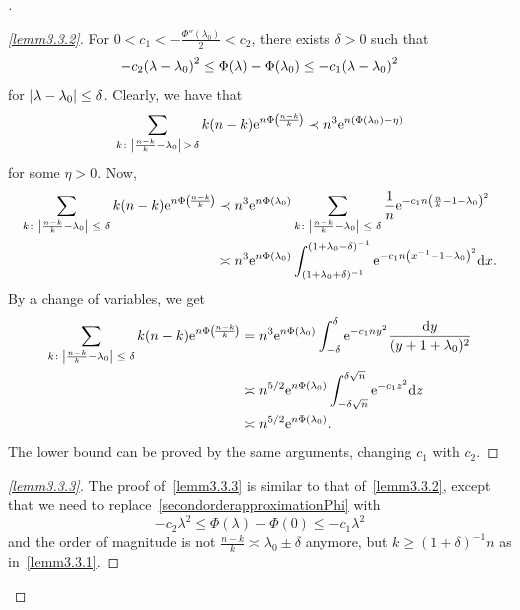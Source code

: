 \documentclass[10pt]{amsart}
\theoremstyle{definition}\newtheorem{defi}[theo]{Definition}\newtheorem{rema}[theo]{Remark}\newtheorem{exam}[theo]{Example}\newtheorem{exem}[theo]{Example}\newtheorem{nota}[theo]{Notation}
\newcommand{\rme}{\mathrm{e}}
\newcommand{\rmd}{\mathrm{d}}
\let\originalleft\left
\let\originalright\right
\renewcommand{\left}{\mathopen{}\mathclose\bgroup\originalleft}
\renewcommand{\right}{\aftergroup\egroup\originalright}
\let\oldle\le
\renewcommand{\le}{\mathchoice{\oldle}{\oldle}{\,\oldle\,}{\,\oldle\,}}
\newenvironment{proofc}[1][\proofname]{\begin{proof}[#1]}{\end{proof}}
\begin{document}
\begin{proofc}
\begin{proof}[{\eqref{lemm3.3.2}}]
For $0 < c_1 < - \frac{\Phi''(\lambda_0)}{2} < c_2$, there exists $\delta > 0$ such that
\begin{equation}\label{secondorderapproximationPhi}
- c_2 \left(\lambda - \lambda_0 \right)^2 \leq \Phi(\lambda) - \Phi(\lambda_0) \leq - c_1 \left(\lambda - \lambda_0 \right)^2
\end{equation}
for $\left| \lambda - \lambda_0 \right| \leq \delta$. Clearly, we have that
\[
\sum_{k \colon \left\lvert \frac{n - k}{k} - \lambda_0 \right\rvert\,>\,\delta} k (n - k) \rme^{n \Phi \left(\!\frac{n - k}{k}\!\right)} \prec n^3 \rme^{n \left(\Phi(\lambda_0) - \eta \right)}
\]
for some $\eta > 0$. Now,
\begin{align*}
\sum_{k \colon \left\lvert\frac{n - k}{k} - \lambda_0 \right\rvert \le \delta} k (n - k) \rme^{n \Phi \left(\!\frac{n - k}{k}\!\right)}
&\prec n^3 \rme^{n \Phi(\lambda_0)} \sum_{k \colon \left\lvert \frac{n - k}{k} - \lambda_0 \right\rvert \le \delta} \frac{1}{n} \rme^{- c_1 n \left(\frac{n}{k} - 1 - \lambda_0 \right)^2} \\
&\asymp n^3 \rme^{n \Phi(\lambda_0)} \int_{(1 + \lambda_0 + \delta)^{-1}}^{(1 + \lambda_0 - \delta)^{-1}} \rme^{- c_1 n \left(x^{-1} - 1 - \lambda_0 \right)^2} \rmd x.
\end{align*}
By a change of variables, we get
\begin{align*}
\sum_{k \colon \left\lvert \frac{n - k}{k} - \lambda_0 \right\rvert \le \delta} k (n - k) \rme^{n \Phi \left(\!\frac{n - k}{k}\!\right)}
&= n^3 \rme^{n \Phi(\lambda_0)} \int_{- \delta}^{\delta} \rme^{-c_1 n y^2} \frac{\rmd y}{(y + 1 + \lambda_0)^2} \\
&\asymp n^{5/2} \rme^{n \Phi(\lambda_0)} \int_{- \delta \sqrt{n}}^{\delta \sqrt{n}} \rme^{- c_1 z^2} \rmd z \\
&\asymp n^{ 5 / 2} \rme^{n \Phi(\lambda_0)}.
\end{align*}
The lower bound can be proved by the same arguments, changing $c_1$ with $c_2$.\let\qed\relax
\end{proof}

\begin{proof}[{\eqref{lemm3.3.3}}]
The proof of~\eqref{lemm3.3.3} is similar to that of~\eqref{lemm3.3.2}, except that we need to replace~\eqref{secondorderapproximationPhi} with
\[
- c_2 \lambda^2 \leq \Phi(\lambda) - \Phi(0) \leq - c_1 \lambda ^2
\]
and the order of magnitude is not $\frac{n-k}{k}\asymp \lambda_0\pm \delta$ anymore, but $k\geq (1+\delta)^{-1}n$ as in~\eqref{lemm3.3.1}. \qedhere
\end{proof}\let\qed\relax
\end{proofc}
\end{document}
